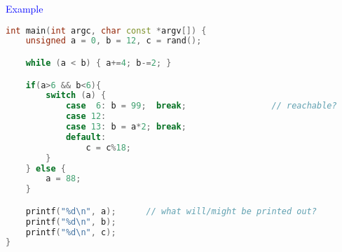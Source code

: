 

\begin{frame}[fragile]{\textcolor{blue}{Example}}
\begin{footnotesize}
\begin{lstlisting}[language=C++]
int main(int argc, char const *argv[]) {
    unsigned a = 0, b = 12, c = rand();

    while (a < b) { a+=4; b-=2; }

    if(a>6 && b<6){
        switch (a) {
            case  6: b = 99;  break;                 // reachable? 
            case 12:
            case 13: b = a*2; break;
            default:
                c = c%18;
        }
    } else {
        a = 88;
    }

    printf("%d\n", a);		// what will/might be printed out?
    printf("%d\n", b);
    printf("%d\n", c);
}
\end{lstlisting}
\end{footnotesize}
\end{frame}
